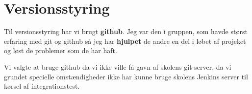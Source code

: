 \section{Versionsstyring}


Til versionsstyring har vi brugt \textbf{github}. Jeg var den i gruppen, som havde størst erfaring med git og github så jeg har \textbf{hjulpet} de andre en del i løbet af projeket og løst de problemer som de har haft.

Vi valgte at bruge github da vi ikke ville få gavn af skolens git-server, da vi grundet specielle omstændigheder ikke har kunne bruge skolens Jenkins server til kørsel af integrationstest.